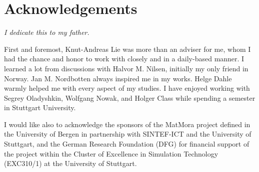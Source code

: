 \chapter{Acknowledgements}

\textit{\small{I dedicate this to my father.}} 

\vspace{1cm}

First and foremost, Knut-Andreas Lie was more than an adviser for me, whom I had
the chance and honor to work with closely and in a daily-based manner. I learned
a lot from discussions with Halvor M. Nilsen, initially my only friend in
Norway. Jan M. Nordbotten always inspired me in my works. Helge Dahle warmly helped me with every aspect of my studies. I have enjoyed working with Segrey Oladyshkin, Wolfgang Nowak, and Holger Class while spending a semester in Stuttgart University.

I would like also to acknowledge the sponsors of the MatMora project defined in the University of Bergen in partnership with SINTEF-ICT and the University of Stuttgart, and the German Research Foundation (DFG) for financial support of the project within the Cluster of Excellence in Simulation Technology (EXC310/1) at the University of Stuttgart.









